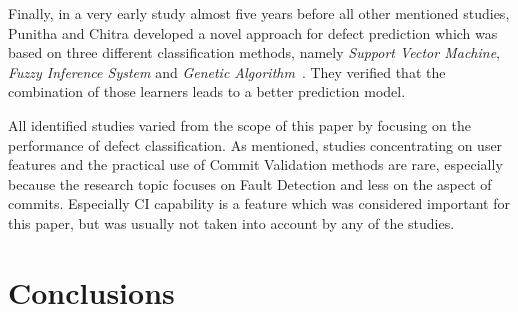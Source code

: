 Finally, in a very early study almost five years before all other mentioned studies, Punitha and Chitra developed a novel approach for defect prediction which was based on three different classification methods, namely \textit{Support Vector Machine}, \textit{Fuzzy Inference System} and \textit{Genetic Algorithm}~\cite{Punitha2013}. They verified that the combination of those learners leads to a better prediction model.

All identified studies varied from the scope of this paper by focusing on the performance of defect classification. As mentioned, studies concentrating on user features and the practical use of Commit Validation methods are rare, especially because the research topic focuses on Fault Detection and less on the aspect of commits. Especially CI capability is a feature which was considered important for this paper, but was usually not taken into account by any of the studies.


\section{Conclusions}
\label{sec:conclusions}



